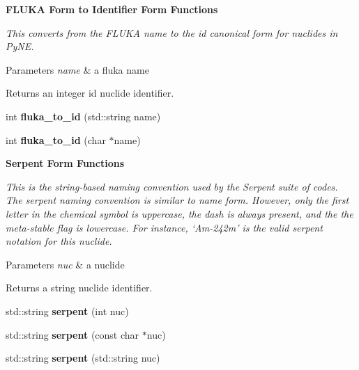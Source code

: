 \begin{Indent}\textbf{ F\+L\+U\+KA Form to Identifier Form Functions}\par
{\em This converts from the F\+L\+U\+KA name to the id canonical form for nuclides in Py\+NE. 
\begin{DoxyParams}{Parameters}
{\em name} & a fluka name \\
\hline
\end{DoxyParams}
\begin{DoxyReturn}{Returns}
an integer id nuclide identifier. 
\end{DoxyReturn}
}\begin{DoxyCompactItemize}
\item 
\mbox{\label{namespacepyne_1_1nucname_a9938dd663fa7160312e033ea088423b8}} 
int {\bfseries fluka\+\_\+to\+\_\+id} (std\+::string name)
\item 
\mbox{\label{namespacepyne_1_1nucname_a5df41bf3c3d1b907a89c49a2485b6b68}} 
int {\bfseries fluka\+\_\+to\+\_\+id} (char $\ast$name)
\end{DoxyCompactItemize}
\end{Indent}
\begin{Indent}\textbf{ Serpent Form Functions}\par
{\em This is the string-\/based naming convention used by the Serpent suite of codes. The serpent naming convention is similar to name form. However, only the first letter in the chemical symbol is uppercase, the dash is always present, and the the meta-\/stable flag is lowercase. For instance, ‘\+Am-\/242m’ is the valid serpent notation for this nuclide. 
\begin{DoxyParams}{Parameters}
{\em nuc} & a nuclide \\
\hline
\end{DoxyParams}
\begin{DoxyReturn}{Returns}
a string nuclide identifier. 
\end{DoxyReturn}
}\begin{DoxyCompactItemize}
\item 
\mbox{\label{namespacepyne_1_1nucname_add93b13ec55e918550681062e48e1fd2}} 
std\+::string {\bfseries serpent} (int nuc)
\item 
\mbox{\label{namespacepyne_1_1nucname_aac7736b1f7f90041ec2d719bf2a4fada}} 
std\+::string {\bfseries serpent} (const char $\ast$nuc)
\item 
\mbox{\label{namespacepyne_1_1nucname_a6c17212425ae2bc60437fa5c96f0b8de}} 
std\+::string {\bfseries serpent} (std\+::string nuc)
\end{DoxyCompactItemize}
\end{Indent}
